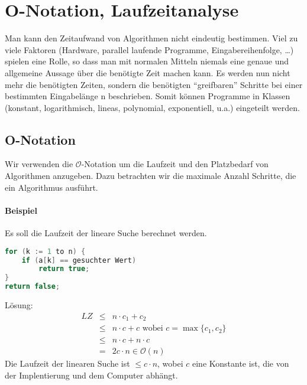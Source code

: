 \chapter{O-Notation, Laufzeitanalyse}
Man kann den Zeitaufwand von Algorithmen nicht eindeutig bestimmen.
Viel zu viele Faktoren (Hardware, parallel laufende Programme, Eingabereihenfolge, \dots) spielen eine Rolle, so dass man mit normalen Mitteln niemals eine genaue und allgemeine Aussage über die benötigte Zeit machen kann.
Es werden nun nicht mehr die benötigten Zeiten, sondern die benötigten ``greifbaren'' Schritte bei einer bestimmten Eingabelänge n beschrieben.
Somit können Programme in Klassen (konstant, logarithmisch, lineas, polynomial, exponentiell, u.a.) eingeteilt werden.

\section{O-Notation}
Wir verwenden die \(\mathcal{O}\)-Notation um die Laufzeit und den Platzbedarf von Algorithmen anzugeben.
Dazu betrachten wir die maximale Anzahl Schritte, die ein Algorithmus ausführt.

\subsubsection{Beispiel}
Es soll die Laufzeit der lineare Suche berechnet werden.
\begin{lstlisting}[language=java, caption={Pseudocode zur Berechnung der Laufzeit}]
for (k := 1 to n) {
	if (a[k] == gesuchter Wert)
		return true;
}
return false;
\end{lstlisting}
Lösung:
\begin{eqnarray*}
	LZ	&\leq& n \cdot c_{1} + c_{2} \\
		&\leq& n \cdot c + c  \textrm{ wobei } c= \max\{c_{1},c_{2}\} \\
		&\leq& n \cdot c + n \cdot c	\\
		&=& 2c \cdot n \in \mathcal{O}(n)
\end{eqnarray*}
Die Laufzeit der linearen Suche ist \(\leq c \cdot n\), wobei \(c\) eine Konstante ist, die von der Implentierung und dem Computer abhängt.

